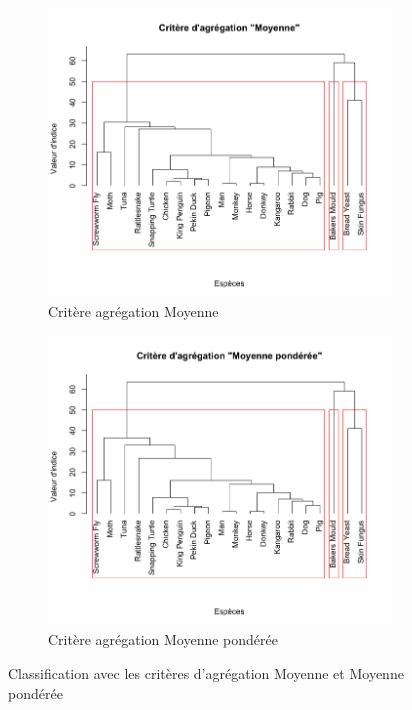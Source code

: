 \documentclass[a4paper,10pt]{report}
\begin{document}
\begin{figure}[H]
	\centering
	\captionsetup{justification=centering, margin=3cm}
	\begin{subfigure}[b]{0.4\linewidth}
		\centering
		\captionsetup{justification=centering}
		\includegraphics[width=1\linewidth]{img/2-1-mut-hierarchie-moy}
		\caption{\scriptsize Critère agrégation Moyenne}
		\label{fig:2-1-mut-hierarchie-moy}
	\end{subfigure}%
	\begin{subfigure}[b]{0.4\linewidth}
		\centering
		\captionsetup{justification=centering}
		\includegraphics[width=1\linewidth]{img/2-1-mut-hierarchie-moy-ponderee}
		\caption{\scriptsize Critère agrégation Moyenne pondérée}
		\label{fig:2-1-mut-hierarchie-moy-ponderee}
	\end{subfigure}%
	\caption{\small Classification avec les critères d'agrégation Moyenne et Moyenne pondérée}
	\label{fig:2-1-classification-mut-moy}%
\end{figure}
\end{document}
